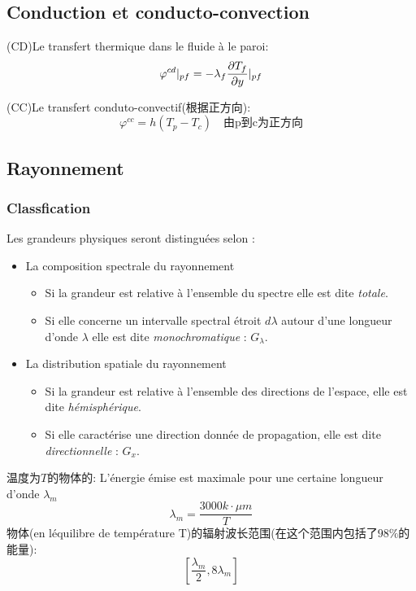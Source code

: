 \subsection{Conduction et conducto-convection}
(CD)Le transfert thermique dans le fluide \`a le paroi:
$$\varphi^{cd} |_{pf} = -\\\lambda _f \frac{\partial T_f}{\partial y}|_{pf}$$

(CC)Le transfert conduto-convectif(根据正方向):
$$\varphi ^{cc}=h(T_p - T_c) \quad \text{由p到c为正方向}$$

\subsection{Rayonnement}

\subsubsection{Classfication}
Les grandeurs physiques seront distinguées selon :
\begin{itemize}
\item La composition spectrale du rayonnement
    \begin{itemize}
        \item Si la grandeur est relative \`a l'ensemble du spectre elle est dite \textit{totale}.
        \item Si elle concerne un intervalle spectral \'etroit $d \lambda$  autour d'une longueur d'onde $\lambda$  elle est dite \textit{monochromatique} : $G_{\lambda }$.
    \end{itemize}

\item La distribution spatiale du rayonnement
    \begin{itemize}
        \item Si la grandeur est relative \`a l'ensemble des directions de l'espace, elle est dite \textit{h\'emisph\'erique}.
        \item Si elle caract\'erise une direction donn\'ee de propagation, elle est dite \textit{directionnelle} : $G_x$.
    \end{itemize}
\end{itemize}
温度为$T$的物体的:
L'\'energie \'emise est maximale pour une certaine longueur d'onde $\lambda _m$
$$\lambda _m=\frac{3000k\cdot \mu m}{T}$$
物体(en l\'equilibre de temp\'erature T)的辐射波长范围(在这个范围内包括了$98\%$的能量):
$$[\frac{\lambda _m }{2},8 \lambda _m]$$

